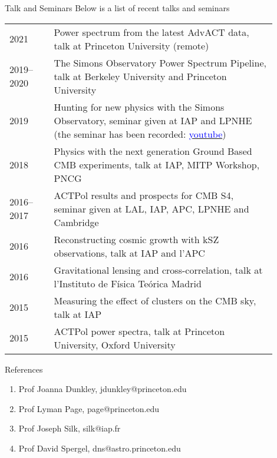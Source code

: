 \documentclass{resume} %
\newcommand{\TIB}[1]{\textcolor{blue}{#1}}
\begin{document}
\begin{rSection}{Talk and Seminars }
Below is a list of recent talks and seminars 
\begin{table}[h]
{\def\arraystretch{1.5}\tabcolsep=0pt
\begin{tabular}{p{0.15\linewidth}p{0.75\linewidth}}
2021 & Power spectrum from the latest AdvACT data, talk at Princeton University (remote) \\
2019--2020 & The Simons Observatory Power Spectrum Pipeline, talk at Berkeley University and Princeton University \\
2019 & Hunting for new physics with the Simons Observatory, seminar given at  IAP and  LPNHE (the seminar has been recorded: \href{https://www.youtube.com/watch?v=1XnZhEU1WgE}{\TIB{youtube}})  \\
2018 & Physics with the next generation Ground Based CMB experiments, talk at IAP, MITP Workshop, PNCG \\
2016--2017 & ACTPol results and prospects for CMB S4, seminar given at LAL, IAP, APC,  LPNHE and Cambridge\\
2016 & Reconstructing cosmic growth with kSZ observations, talk at IAP and l'APC \\
2016 & Gravitational lensing and cross-correlation, talk at l'Instituto de Física Teórica Madrid \\
2015 & Measuring the effect of clusters on the CMB sky, talk at IAP \\
2015 & ACTPol power spectra, talk at Princeton University, Oxford University
\vspace{0.5cm}
\end{tabular}%
}
\end{table}
\vspace{-0.6cm}
\end{rSection}


\begin{rSection}{References }

\begin{enumerate}
\item Prof Joanna Dunkley, jdunkley@princeton.edu
\item Prof Lyman Page, page@princeton.edu
\item Prof Joseph Silk, silk@iap.fr
\item Prof David Spergel, dns@astro.princeton.edu
\end{enumerate}

\end{rSection}
\end{document}
